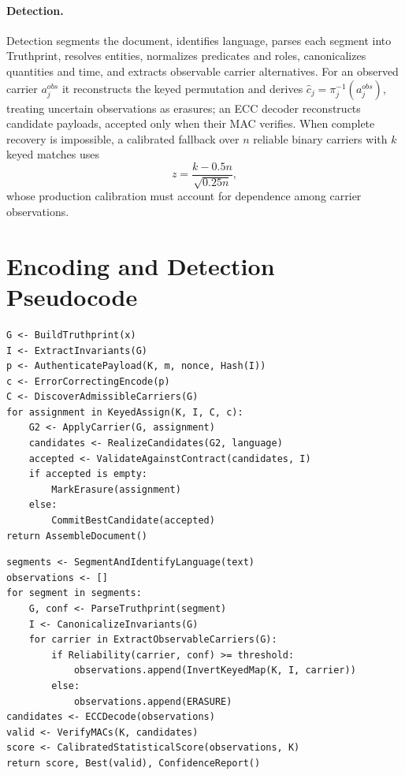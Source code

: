 \documentclass[journal]{IEEEtran}
\begin{document}
\paragraph{Detection.} Detection segments the document, identifies language, parses each segment into Truthprint, resolves entities, normalizes predicates and roles, canonicalizes quantities and time, and extracts observable carrier alternatives. For an observed carrier $a_j^{obs}$ it reconstructs the keyed permutation and derives $\hat{c}_j=\pi_j^{-1}(a_j^{obs})$, treating uncertain observations as erasures; an ECC decoder reconstructs candidate payloads, accepted only when their MAC verifies. When complete recovery is impossible, a calibrated fallback over $n$ reliable binary carriers with $k$ keyed matches uses
\begin{equation}
z=\frac{k-0.5n}{\sqrt{0.25n}},
\label{eq:zscore}
\end{equation}
whose production calibration must account for dependence among carrier observations.

\section{Encoding and Detection Pseudocode}
\label{app:pseudocode}
\begin{lstlisting}[caption={Truthprint encoding pseudocode.}]
G <- BuildTruthprint(x)
I <- ExtractInvariants(G)
p <- AuthenticatePayload(K, m, nonce, Hash(I))
c <- ErrorCorrectingEncode(p)
C <- DiscoverAdmissibleCarriers(G)
for assignment in KeyedAssign(K, I, C, c):
    G2 <- ApplyCarrier(G, assignment)
    candidates <- RealizeCandidates(G2, language)
    accepted <- ValidateAgainstContract(candidates, I)
    if accepted is empty:
        MarkErasure(assignment)
    else:
        CommitBestCandidate(accepted)
return AssembleDocument()
\end{lstlisting}
\begin{lstlisting}[caption={Truthprint detection pseudocode.}]
segments <- SegmentAndIdentifyLanguage(text)
observations <- []
for segment in segments:
    G, conf <- ParseTruthprint(segment)
    I <- CanonicalizeInvariants(G)
    for carrier in ExtractObservableCarriers(G):
        if Reliability(carrier, conf) >= threshold:
            observations.append(InvertKeyedMap(K, I, carrier))
        else:
            observations.append(ERASURE)
candidates <- ECCDecode(observations)
valid <- VerifyMACs(K, candidates)
score <- CalibratedStatisticalScore(observations, K)
return score, Best(valid), ConfidenceReport()
\end{lstlisting}
\end{document}
